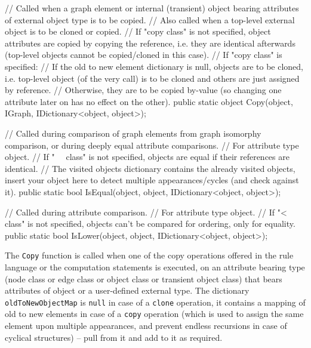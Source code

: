 \begin{csharplet}
// Called when a graph element or internal (transient) object bearing attributes of external object type is to be copied.
// Also called when a top-level external object is to be cloned or copied.
// If "copy class" is not specified, object attributes are copied by copying the reference, i.e. they are identical afterwards (top-level objects cannot be copied/cloned in this case).
// If "copy class" is specified:
// If the old to new element dictionary is null, objects are to be cloned, i.e. top-level object (of the very call) is to be cloned and others are just assigned by reference.
// Otherwise, they are to be copied by-value (so changing one attribute later on has no effect on the other).
public static object Copy(object, IGraph, IDictionary<object, object>);

// Called during comparison of graph elements from graph isomorphy comparison, or during deeply equal attribute comparisons.
// For attribute type object.
// If "~~ class" is not specified, objects are equal if their references are identical.
// The visited objects dictionary contains the already visited objects, insert your object here to detect multiple appearances/cycles (and check against it).
public static bool IsEqual(object, object, IDictionary<object, object>);

// Called during attribute comparison.
// For attribute type object.
// If "< class" is not specified, objects can't be compared for ordering, only for equality.
public static bool IsLower(object, object, IDictionary<object, object>);
\end{csharplet}

The \texttt{Copy} function is called when one of the copy operations offered in the rule language or the computation statements is executed, on an attribute bearing type (node class or edge class or object class or transient object class) that bears attributes of object or a user-defined external type. The dictionary \texttt{oldToNewObjectMap} is \texttt{null} in case of a \texttt{clone} operation, it contains a mapping of old to new elements in case of a \texttt{copy} operation (which is used to assign the same element upon multiple appearances, and prevent endless recursions in case of cyclical structures) -- pull from it and add to it as required.


